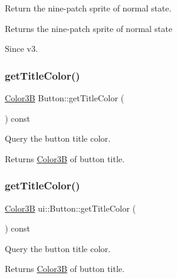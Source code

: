 Return the nine-\/patch sprite of normal state. 

\begin{DoxyReturn}{Returns}
the nine-\/patch sprite of normal state 
\end{DoxyReturn}
\begin{DoxySince}{Since}
v3. 
\end{DoxySince}
\mbox{\label{classui_1_1Button_a687c31578459d373399805a3ffa4e219}} 
\subsubsection{\texorpdfstring{get\+Title\+Color()}{getTitleColor()}\hspace{0.1cm}{\footnotesize\ttfamily [1/2]}}
{\footnotesize\ttfamily \hyperlink{structColor3B}{Color3B} Button\+::get\+Title\+Color (\begin{DoxyParamCaption}{ }\end{DoxyParamCaption}) const}

Query the button title color. \begin{DoxyReturn}{Returns}
\hyperlink{structColor3B}{Color3B} of button title. 
\end{DoxyReturn}
\mbox{\label{classui_1_1Button_a3ca6e801b457b25816093598aea4731d}} 
\subsubsection{\texorpdfstring{get\+Title\+Color()}{getTitleColor()}\hspace{0.1cm}{\footnotesize\ttfamily [2/2]}}
{\footnotesize\ttfamily \hyperlink{structColor3B}{Color3B} ui\+::\+Button\+::get\+Title\+Color (\begin{DoxyParamCaption}{ }\end{DoxyParamCaption}) const}

Query the button title color. \begin{DoxyReturn}{Returns}
\hyperlink{structColor3B}{Color3B} of button title. 
\end{DoxyReturn}
\mbox{\label{classui_1_1Button_a81290d5112bdac0907c96afbd2c32c08}} 
